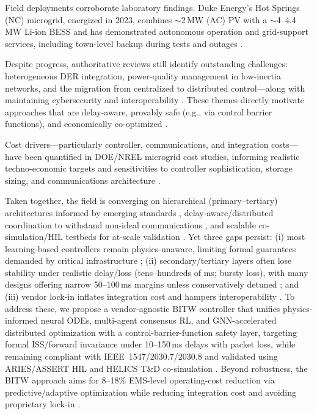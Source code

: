 \documentclass[12pt]{article}
\begin{document}
Field deployments corroborate laboratory findings. Duke Energy's Hot Springs (NC) microgrid, energized in 2023, combines $\sim$2\,MW (AC) PV with a $\sim$4--4.4\,MW Li-ion BESS and has demonstrated autonomous operation and grid-support services, including town-level backup during tests and outages \cite{Duke2023HotSpringsPR,TDWorld2023HotSprings}.

Despite progress, authoritative reviews still identify outstanding challenges: heterogeneous DER integration, power-quality management in low-inertia networks, and the migration from centralized to distributed control---along with maintaining cybersecurity and interoperability \cite{Hirsch2018RSER}. These themes directly motivate approaches that are delay-aware, provably safe (e.g., via control barrier functions), and economically co-optimized \cite{Ames2019CBF}.

Cost drivers---particularly controller, communications, and integration costs---have been quantified in DOE/NREL microgrid cost studies, informing realistic techno-economic targets and sensitivities to controller sophistication, storage sizing, and communications architecture \cite{NREL2018CostStudy}.

Taken together, the field is converging on hierarchical (primary--tertiary) architectures informed by emerging standards \cite{Guerrero2011Hierarchical,IEEE1547_2018,IEEE20307_2017,IEEE20308_2018}, delay-aware/distributed coordination to withstand non-ideal communications \cite{Liu2015DelaySecondary,Lu2017DistributedSecondary}, and scalable co-simulation/HIL testbeds for at-scale validation \cite{Hardy2024HELICS,Zheng2024ITD,Chanda2023ASSERT}. Yet three gaps persist: (i) most learning-based controllers remain physics-unaware, limiting formal guarantees demanded by critical infrastructure \cite{Hirsch2018RSER,Ames2019CBF}; (ii) secondary/tertiary layers often lose stability under realistic delay/loss (tens--hundreds of ms; bursty loss), with many designs offering narrow 50--100\,ms margins unless conservatively detuned \cite{Liu2015DelaySecondary,Lu2017DistributedSecondary}; and (iii) vendor lock-in inflates integration cost and hampers interoperability \cite{NREL2018CostStudy,IEEE20307_2017}. To address these, we propose a vendor-agnostic BITW controller that unifies physics-informed neural ODEs, multi-agent consensus RL, and GNN-accelerated distributed optimization with a control-barrier-function safety layer, targeting formal ISS/forward invariance under 10--150\,ms delays with packet loss, while remaining compliant with IEEE~1547/2030.7/2030.8 and validated using ARIES/ASSERT HIL and HELICS T\&D co-simulation \cite{IEEE1547_2018,IEEE20307_2017,IEEE20308_2018,Chanda_ASSERT_ATEE_2023,NREL_ARIES_Capabilities_2025,NREL_ARIES_ResearchPlan_2021,Hardy2024HELICS,Zheng2024ITD}. Beyond robustness, the BITW approach aims for 8--18\% EMS-level operating-cost reduction via predictive/adaptive optimization \cite{GarciaTorres2021MPCReview,Singh2025SciRep} while reducing integration cost and avoiding proprietary lock-in \cite{NREL2018CostStudy}.
\vspace{-0.5cm}
\end{document}
